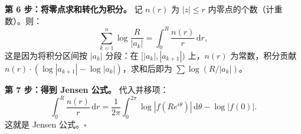 \textbf{第 6 步：将零点求和转化为积分。}
记 $n(r)$ 为 $|z| \le r$ 内零点的个数（计重数）。则：
\[
  \sum_{k=1}^n \log\frac{R}{|a_k|}
  = \int_0^R \frac{n(r)}{r} \,\mathrm{d}r,
\]
这是因为将积分区间按 $|a_k|$ 分段：在 $[|a_k|, |a_{k+1}|)$ 上，$n(r)$ 为常数，积分贡献 $n(r) \cdot (\log|a_{k+1}| - \log|a_k|)$，求和后即为 $\sum \log(R/|a_k|)$。

\textbf{第 7 步：得到 Jensen 公式。}
代入并移项：
\[
  \int_0^R \frac{n(r)}{r} \,\mathrm{d}r
  = \frac{1}{2\pi} \int_0^{2\pi} \log |f(Re^{i\theta})| \,\mathrm{d}\theta - \log |f(0)|.
\]
这就是 Jensen 公式。$\square$
